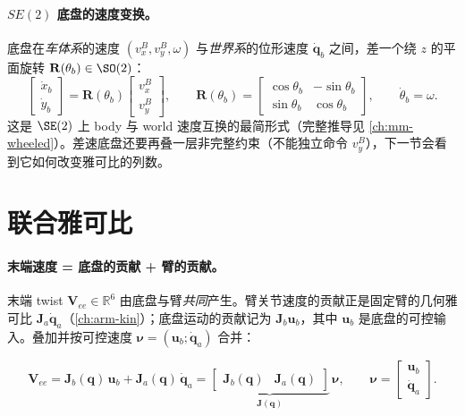 \paragraph{$SE(2)$ 底盘的速度变换。}
底盘在\emph{车体系}的速度 $(v_x^B,v_y^B,\omega)$ 与\emph{世界系}的位形速度 $\dot{\mathbf{q}}_b$ 之间，差一个绕 $z$ 的平面旋转 $\mathbf{R}(\theta_b)\in\SO(2)$：
\begin{equation}
  \begin{bmatrix}\dot x_b\\\dot y_b\end{bmatrix}=\mathbf{R}(\theta_b)\begin{bmatrix}v_x^B\\v_y^B\end{bmatrix},\qquad
  \mathbf{R}(\theta_b)=\begin{bmatrix}\cos\theta_b&-\sin\theta_b\\\sin\theta_b&\cos\theta_b\end{bmatrix},\qquad
  \dot\theta_b=\omega.
  \label{eq:mmk-se2vel}
\end{equation}
这是 $\SE(2)$ 上 body 与 world 速度互换的最简形式（完整推导见 \cref{ch:mm-wheeled}）。差速底盘还要再叠一层非完整约束（不能独立命令 $v_y^B$），下一节会看到它如何改变雅可比的列数。

\section{联合雅可比}
\label{sec:mmk-jacobian}

\paragraph{末端速度 = 底盘的贡献 + 臂的贡献。}
末端 twist $\mathbf{V}_{ee}\in\mathbb{R}^6$ 由底盘与臂\emph{共同}产生。臂关节速度的贡献正是固定臂的几何雅可比 $\mathbf{J}_a\dot{\mathbf{q}}_a$（\cref{ch:arm-kin}）；底盘运动的贡献记为 $\mathbf{J}_b\mathbf{u}_b$，其中 $\mathbf{u}_b$ 是底盘的可控输入。叠加并按可控速度 $\boldsymbol{\nu}=(\mathbf{u}_b;\dot{\mathbf{q}}_a)$ 合并：

\begin{definition}[联合雅可比]\label{def:mmk-jac}
\begin{equation}
  \mathbf{V}_{ee}=\mathbf{J}_b(\mathbf{q})\,\mathbf{u}_b+\mathbf{J}_a(\mathbf{q})\,\dot{\mathbf{q}}_a
  =\underbrace{\begin{bmatrix}\mathbf{J}_b(\mathbf{q})&\mathbf{J}_a(\mathbf{q})\end{bmatrix}}_{\mathbf{J}(\mathbf{q})}\,\boldsymbol{\nu},
  \qquad \boldsymbol{\nu}=\begin{bmatrix}\mathbf{u}_b\\\dot{\mathbf{q}}_a\end{bmatrix}.
  \label{eq:mmk-joint-jac}
\end{equation}
\end{definition}

